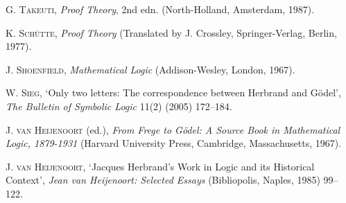 \documentclass[a4paper,12pt]{report}
\theoremstyle{definition}
\begin{document}
\begin{thebibliography}{99}
\textsc{G. Takeuti},
\emph{Proof Theory}, 2nd edn.
(North-Holland, Amsterdam, 1987).

\textsc{K. Sch\"u{tte}},
\emph{Proof Theory}
(Translated by J. Crossley, Springer-Verlag, Berlin, 1977).

\textsc{J. Shoenfield},
\emph{Mathematical Logic}
(Addison-Wesley, London, 1967).

\textsc{W. Sieg},
`Only two letters: The correspondence between Herbrand and G\"o{del}',
\emph{The Bulletin of Symbolic Logic} 11(2)
(2005)
172--184.

\textsc{J. van Heijenoort} (ed.),
\emph{From Frege to G\"{odel}: A Source Book in Mathematical Logic, 1879-1931}
(Harvard University Press, Cambridge, Massachusetts, 1967).

\textsc{J. van Heijenoort},
`Jacques Herbrand's Work in Logic and its Historical Context',
\emph{Jean van Heijenoort: Selected Essays}
(Bibliopolis, Naples, 1985)
99--122.

\end{thebibliography}
\end{document}
